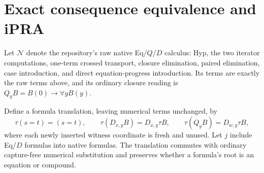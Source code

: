 \section{Exact consequence equivalence and iPRA}
\label{sec:rp-equivalence}

Let $\mathcal N$ denote the repository's raw native Eq/$Q$/$D$ calculus:
Hyp, the two iterator computations, one-term crossed transport, closure
elimination, paired elimination, case introduction, and direct
equation-progress introduction.  Its terms are exactly the raw terms
above, and its ordinary closure reading is
$Q_yB=B(0)\to\forall yB(y)$.

Define a formula translation, leaving numerical terms unchanged, by
\[
 \tau(s=t)=(s=t),\qquad
 \tau(D_{x,y}B)=D_{x,y}\tau B,\qquad
 \tau(Q_yB)=D_{w,y}\tau B,
\]
where each newly inserted witness coordinate is fresh and unused.
Let $j$ include Eq/$D$ formulas into native formulas.  The translation
commutes with ordinary capture-free numerical substitution and preserves
whether a formula's root is an equation or compound.


